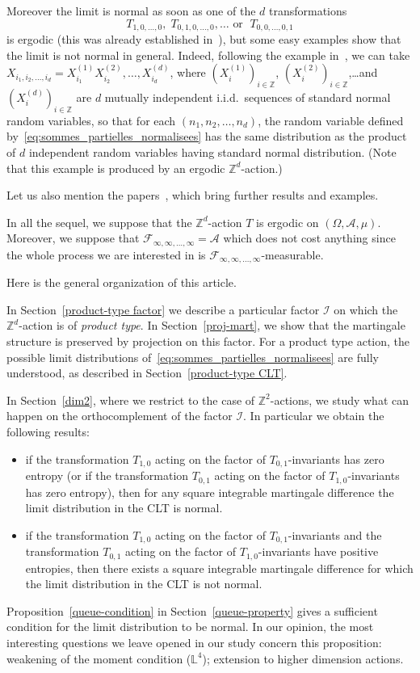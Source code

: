 \documentclass[10pt]{amsart}
\theoremstyle{definition}\newtheorem{defi}[theo]{Definition}\newtheorem{rema}[theo]{Remark}\newtheorem{exam}[theo]{Example}\newtheorem{exem}[theo]{Example}\newtheorem{nota}[theo]{Notation}
\newcommand{\Z}{\mathbb{Z}}
\newcommand*\bbL{\mathbb{L}}
\newcommand*\I{\mathcal{I}}
\newcommand*\A{\mathcal{A}}
\newcommand*\F{\mathcal{F}}
\begin{document}
Moreover the limit is normal as soon as one of the $d$ transformations
\[
T_{1,0,\dots,0},
\; T_{0,1,0,\dots,0},\dots \text{ or }\;T_{0,0,\dots,0,1}
\]
is ergodic (this was already established in~\cite{MR3427925}), but some easy examples show that the limit is not normal in general. Indeed, following the example in~\cite{MR3222815}, we can take $X_{i_1,i_2,\dots,i_d}=X^{(1)}_{i_1}X^{(2)}_{i_2},\dots, X^{(d)}_{i_d}$, where $(X^{(1)}_i)_{i\in\Z}$, $(X^{(2)}_i)_{i\in\Z}$,\dots and $(X^{(d)}_i)_{i\in\Z}$ are $d$ mutually independent i.i.d.\ sequences of standard normal random variables, so that for each $(n_1,n_2, \dots,n_d)$, the random variable defined by~\eqref{eq:sommes_partielles_normalisees} has the same distribution as the product of $d$ independent random variables having standard normal distribution. (Note that this example is produced by an ergodic $\Z^d$-action.)


Let us also mention the papers~\cite{MR3504508,MR3869881}, which bring further results and examples.

{In all the sequel, we suppose that the $\Z^d$-action $T$ is ergodic on $(\Omega,\A,\mu)$. Moreover, we suppose that $\F_{\infty,\infty,\dots,\infty}=\A$ which does not cost anything since the whole process we are interested in is $\F_{\infty,\infty,\dots,\infty}$-measurable.}

Here is the general organization of this article.

In Section~\ref{product-type factor} we describe a particular factor $\I$ on which the {$\Z^d$-action} is of \emph{product type}. In Section~\ref{proj-mart}, we show that the martingale structure is preserved by projection on this factor. For a product type action, the possible limit distributions of~\eqref{eq:sommes_partielles_normalisees} are fully understood, as described in Section~\ref{product-type CLT}.

In Section~\ref{dim2}, where we restrict to the case of $\Z^2$-actions, we study what can happen on the orthocomplement of the factor $\I$. In particular we obtain the following results:
\begin{itemize}
\item if the transformation $T_{1,0}$ acting on the factor of $T_{0,1}$-invariants has zero entropy (or if the transformation $T_{0,1}$ acting on the factor of $T_{1,0}$-invariants has zero entropy), then for any square integrable martingale difference the limit distribution in the CLT is normal.

\item if the transformation $T_{1,0}$ acting on the factor of $T_{0,1}$-invariants and the transformation $T_{0,1}$ acting on the factor of $T_{1,0}$-invariants have positive entropies, then there exists a square integrable martingale difference for which the limit distribution in the CLT is not normal.
\end{itemize}
{Proposition~\ref{queue-condition} in Section~\ref{queue-property} gives a sufficient condition for the limit distribution to be normal. In our opinion, the most interesting questions we leave opened in our study concern this proposition: weakening of the moment condition ($\bbL^4$); extension to higher dimension actions.}
\end{document}
